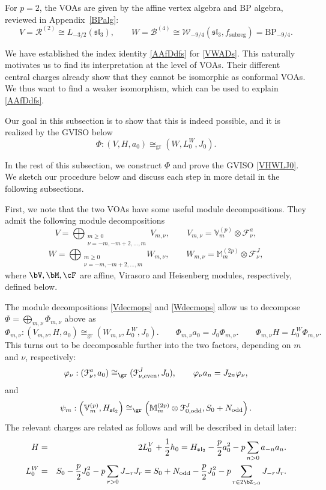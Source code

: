 \documentclass[a4paper,11pt]{article}
\theoremstyle{definition}
\theoremstyle{definition}
\theoremstyle{remark}
\newcommand{\be}{\begin{equation}}
\newcommand{\ee}{\end{equation}}
\newcommand{\beqn}{\begin{eqnarray}}
\newcommand{\eeqn}{\end{eqnarray}}
\begin{document}
 For $p=2$, the VOAs are   given by the affine vertex algebra and  BP algebra, reviewed in Appendix~\ref{BPalg}:
\be
V = \mathcal{R}^{(2)} \cong L_{-3/2}(\mathfrak{sl}_3), \qquad
W = \mathcal{B}^{(4)} \cong \mathcal{W}_{-9/4}(\mathfrak{sl}_3, f_{{\text{subreg}}}) = \mathrm{BP}_{-9/4}.
\ee


We  have established the index identity \eqref{AAfDdfs} for \eqref{VWADs}. This naturally motivates us to find its interpretation at the level of VOAs. Their different central charges already show that they cannot be isomorphic as conformal VOAs. We thus want to find a weaker isomorphism, which can be used to explain \eqref{AAfDdfs}.


Our goal in this subsection is to show that this is indeed possible, and it is realized by the  GVISO below
\be\label{VHWLJ0}
\Phi :
(V,H,a_0)\cong_\text{gr}(W,L_0^W,J_0).
\ee 

In the rest of this subsection, we  construct $\Phi$ and prove the GVISO \eqref{VHWLJ0}. We sketch our procedure below and discuss each step  in more detail in the following subsections. 
 
First, we note that the two VOAs have some useful module decompositions.  They  admit the following module  decompositions    \cite[Eqs.~(27)--(28)]{Adamovic:2020lvj}
\be
V=\bigoplus_{\substack{m\geq0\\\nu=-m,-m+2,\ldots,m}}V_{m,\nu},
\qquad
V_{m,\nu}=\mathbb V_m^{(p)}\otimes\mathcal F_\nu^a,
\label{Vdecmops}
\ee
\be
W=\bigoplus_{\substack{m\geq0\\\nu=-m,-m+2,\ldots,m}}W_{m,\nu},
\qquad
W_{m,\nu}=\mathbb M_m^{(2p)}\otimes\mathcal F_\nu^J,
\label{Wdecmops}
\ee
where $\bV,\bM, \cF$ are affine, Virasoro and Heisenberg modules, respectively, defined
below.
 

The module decompositions \eqref{Vdecmops} and \eqref{Wdecmops} allow  us to decompose $\Phi=\bigoplus_{m,\nu}\Phi_{m,\nu}$ above as 
\be\label{Phimu}
\Phi_{m,\nu} :
(V_{m,\nu}, H, a_0) \cong_{\mathrm{gr}} (W_{m,\nu}, L_0^W, J_0).
\qquad
\Phi_{m,\nu} a_0 = J_0 \Phi_{m,\nu}.
\qquad
\Phi_{m,\nu} H = L_0^W \Phi_{m,\nu}.
\ee
This turns out to be decomposable further into the two   factors, depending on $m$ and $\nu$, respectively: 
\be  
\varphi_\nu :\left(\mathcal{F}_\nu^a, a_0\right) \cong_{\gr} (\mathcal{F}_{\nu,\mathrm{even}}^J, J_0), \qquad \varphi_\nu a_n = J_{2n} \varphi_\nu,
\label{phinu}
\ee
and
\be
\psi_m: 
\left(\mathbb V_m^{(p)},H_{\mathfrak{sl}_2}\right)
\cong_{\gr}
\left(\mathbb M_m^{(2p)}\otimes\mathcal F^J_{0,\mathrm{odd}},
S_0+N_{\mathrm{odd}}\right).
\label{psim}
\ee
The relevant  charges  are related as follows and will be described in detail later:
\beqn
H&=&2L_0^V+\frac12h_0
=H_{\mathfrak{sl}_2}-\frac p2a_0^2
-p\sum_{n>0}a_{-n}a_n. 
\\
L_0^W&=&
S_0-\frac p2J_0^2-p\sum_{r>0}J_{-r}J_r
=
S_0+N_\text{odd}-\frac p2J_0^2-p\sum_{r\in 2\bZ_{>0}}J_{-r}J_r.
\eeqn
 
\end{document}
